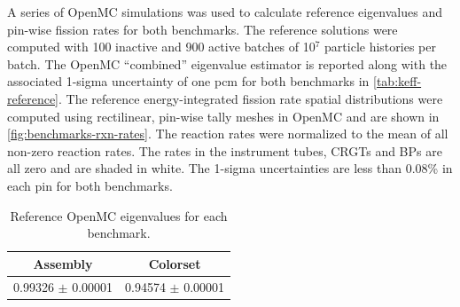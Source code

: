 A series of OpenMC simulations was used to calculate reference eigenvalues and pin-wise fission rates for both benchmarks. The reference solutions were computed with 100 inactive and 900 active batches of 10$^7$ particle histories per batch. The OpenMC ``combined'' eigenvalue estimator is reported along with the associated 1-sigma uncertainty of one pcm for both benchmarks in \autoref{tab:keff-reference}. The reference energy-integrated fission rate spatial distributions were computed using rectilinear, pin-wise tally meshes in OpenMC and are shown in \autoref{fig:benchmarks-rxn-rates}. The reaction rates were normalized to the mean of all non-zero reaction rates. The rates in the instrument tubes, CRGTs and BPs are all zero and are shaded in white. The 1-sigma uncertainties are less than 0.08\% in each pin for both benchmarks.

\begin{table}[h!]
  \centering
  \caption{Reference OpenMC eigenvalues for each benchmark.}
  \label{tab:keff-reference} 
  \begin{tabular}{c c}
  \toprule
  {\bf Assembly} &
  {\bf Colorset} \\
  \midrule
  0.99326 $\pm$ 0.00001 & 0.94574 $\pm$ 0.00001 \\
  \bottomrule
\end{tabular}
\end{table}

